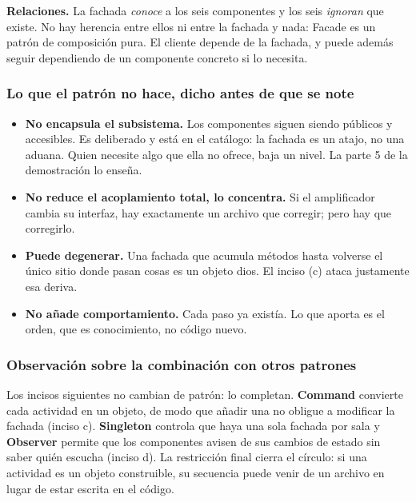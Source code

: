 \textbf{Relaciones.} La fachada \emph{conoce} a los seis componentes y los seis
\emph{ignoran} que existe. No hay herencia entre ellos ni entre la fachada y nada: Facade es
un patrón de composición pura. El cliente depende de la fachada, y puede además seguir
dependiendo de un componente concreto si lo necesita.

\subsubsection*{Lo que el patrón no hace, dicho antes de que se note}

\begin{itemize}[leftmargin=1.2cm]
    \item \textbf{No encapsula el subsistema.} Los componentes siguen siendo públicos y
          accesibles. Es deliberado y está en el catálogo: la fachada es un atajo, no una
          aduana. Quien necesite algo que ella no ofrece, baja un nivel. La parte 5 de la
          demostración lo enseña.
    \item \textbf{No reduce el acoplamiento total, lo concentra.} Si el amplificador cambia
          su interfaz, hay exactamente un archivo que corregir; pero hay que corregirlo.
    \item \textbf{Puede degenerar.} Una fachada que acumula métodos hasta volverse el único
          sitio donde pasan cosas es un objeto dios. El inciso (c) ataca justamente esa
          deriva.
    \item \textbf{No añade comportamiento.} Cada paso ya existía. Lo que aporta es el orden,
          que es conocimiento, no código nuevo.
\end{itemize}

\subsubsection*{Observación sobre la combinación con otros patrones}

Los incisos siguientes no cambian de patrón: lo completan. \textbf{Command} convierte cada
actividad en un objeto, de modo que añadir una no obligue a modificar la fachada (inciso c).
\textbf{Singleton} controla que haya una sola fachada por sala y \textbf{Observer} permite que
los componentes avisen de sus cambios de estado sin saber quién escucha (inciso d). La
restricción final cierra el círculo: si una actividad es un objeto construible, su secuencia
puede venir de un archivo en lugar de estar escrita en el código.

\fussy
